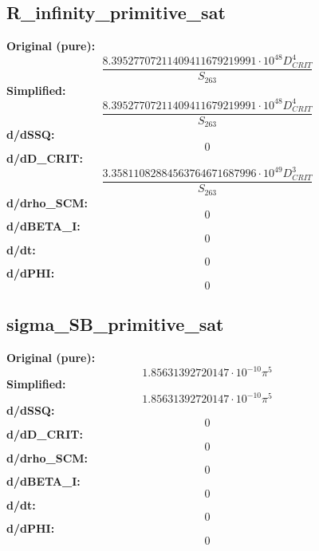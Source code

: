 \subsection{R_infinity_primitive_sat}
\textbf{Original (pure):}
\begin{equation}
\frac{8.39527707211409411679219991 \cdot 10^{48} D_{CRIT}^{4}}{S_{26 3}}
\end{equation}
\textbf{Simplified:}
\begin{equation}
\frac{8.39527707211409411679219991 \cdot 10^{48} D_{CRIT}^{4}}{S_{26 3}}
\end{equation}
\textbf{d/dSSQ:}
\begin{equation}
0
\end{equation}
\textbf{d/dD_CRIT:}
\begin{equation}
\frac{3.35811082884563764671687996 \cdot 10^{49} D_{CRIT}^{3}}{S_{26 3}}
\end{equation}
\textbf{d/drho_SCM:}
\begin{equation}
0
\end{equation}
\textbf{d/dBETA_I:}
\begin{equation}
0
\end{equation}
\textbf{d/dt:}
\begin{equation}
0
\end{equation}
\textbf{d/dPHI:}
\begin{equation}
0
\end{equation}

\subsection{sigma_SB_primitive_sat}
\textbf{Original (pure):}
\begin{equation}
1.85631392720147 \cdot 10^{-10} \pi^{5}
\end{equation}
\textbf{Simplified:}
\begin{equation}
1.85631392720147 \cdot 10^{-10} \pi^{5}
\end{equation}
\textbf{d/dSSQ:}
\begin{equation}
0
\end{equation}
\textbf{d/dD_CRIT:}
\begin{equation}
0
\end{equation}
\textbf{d/drho_SCM:}
\begin{equation}
0
\end{equation}
\textbf{d/dBETA_I:}
\begin{equation}
0
\end{equation}
\textbf{d/dt:}
\begin{equation}
0
\end{equation}
\textbf{d/dPHI:}
\begin{equation}
0
\end{equation}

